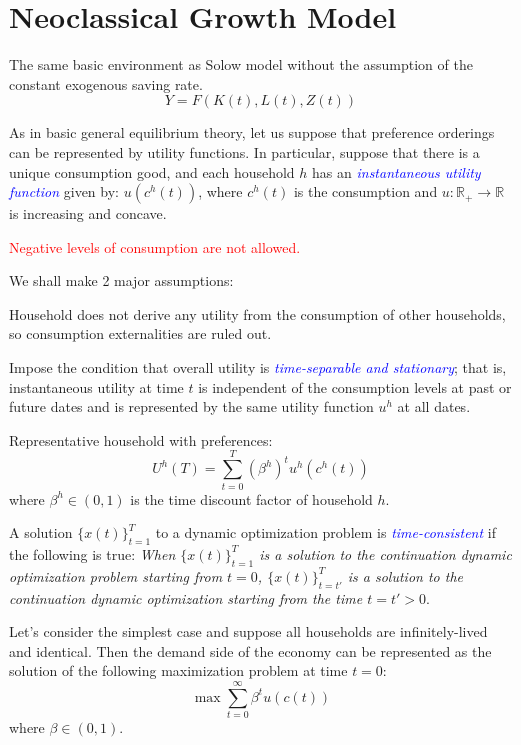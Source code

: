 \section{Neoclassical Growth Model}

The same basic environment as Solow model without the assumption of the constant exogenous saving rate.
\[ Y = F(K(t), L(t), Z(t)) \]

As in basic general equilibrium theory, let us suppose that preference orderings can be represented by utility functions. In particular, suppose that there is a unique consumption good, and each household $h$ has an \textit{\textcolor{blue}{instantaneous utility function}} given by: $u(c^h(t))$, where $c^h(t)$ is the consumption and $u : \mathbb{R}_+ \rightarrow \mathbb{R}$ is increasing and concave.

\begin{note}
\textcolor{red}{Negative levels of consumption are not allowed.}
\end{note}

We shall make 2 major assumptions:

\begin{description}[nosep]
\item[1.] Household does not derive any utility from the consumption of other households, so consumption externalities are ruled out.
\item[2.] Impose the condition that overall utility is \textcolor{blue}{\textit{time-separable and stationary}}; that is, instantaneous utility at time $t$ is independent of the consumption levels at past or future dates and is represented by the same utility function $u^h$ at all dates.
\end{description}

Representative household with preferences:
\[ U^h(T) = \sum_{t = 0}^T (\beta^h)^t u^h(c^h(t)) \]
where $\beta^h \in (0, 1)$ is the time discount factor of household $h$.

A solution $\{x(t)\}_{t = 1}^T$ to a dynamic optimization problem is \textit{\textcolor{blue}{time-consistent}} if the following is true: \textit{When $\{x(t)\}_{t = 1}^T$ is a solution to the continuation dynamic optimization problem starting from $t = 0$, $\{x(t)\}_{t = t'}^T$ is a solution to the continuation dynamic optimization starting from the time $t = t' > 0$}.

Let's consider the simplest case and suppose all households are infinitely-lived and identical. Then the demand side of the economy can be represented as the solution of the following maximization problem at time $t = 0$:
\[ \max \sum_{t = 0}^{\infty} \beta^t u(c(t)) \]
where $\beta \in (0, 1)$.

